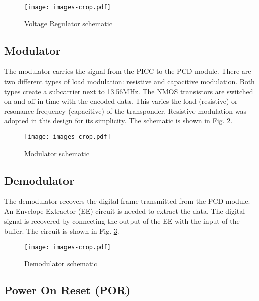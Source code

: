 
\begin{figure}[]
  \centering
  \texttt{[image: images-crop.pdf]}
  \caption{Voltage Regulator schematic}
  \label{fig:ldo}
\end{figure}

\subsection{Modulator}

The modulator \cite{rfid_modulador} carries the signal from the PICC to the PCD module. There are two different types of load modulation: resistive and capacitive modulation. Both types create a subcarrier next to 13.56MHz. The NMOS transistors are switched on and off in time with the encoded data. This varies the load (resistive) or resonance frequency  (capacitive) of the transponder.  Resistive modulation was adopted in this design for its simplicity. The schematic is shown in Fig. \ref{fig:mod}.

\begin{figure}[h]
  \centering
  \texttt{[image: images-crop.pdf]}
  \caption{Modulator schematic}
  \label{fig:mod}
\end{figure}

\subsection{Demodulator}

The demodulator recovers the digital frame transmitted from the PCD module. An Envelope Extractor (EE) circuit \cite{rfid_demodulador} is needed to extract the data. The digital signal is recovered by connecting the output of the EE with the input of the buffer. The circuit is shown in Fig. \ref{fig:demod}. 

\begin{figure}[h]
  \centering
  \texttt{[image: images-crop.pdf]}
  \caption{Demodulator schematic}
  \label{fig:demod}
\end{figure}

\subsection{Power On Reset (POR)}

